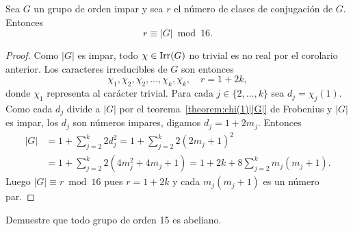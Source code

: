 \begin{theorem}[Burnside]
  Sea $G$ un grupo de orden impar y sea $r$ el número de clases de conjugación
  de $G$. Entonces 
  \[
	  r\equiv|G|\bmod{16}.
  \]
\end{theorem}

\begin{proof}
  Como $|G|$ es impar, todo $\chi\in\operatorname{Irr}(G)$ no trivial es no real por el
  corolario anterior. Los caracteres irreducibles de $G$ son entonces 
  \[
    \chi_1,\chi_2,\overline{\chi_2},\dots,\chi_k,\overline{\chi_k},
    \quad
    r=1+2k,
  \]
  donde $\chi_1$ representa al carácter trivial. 
  Para cada $j\in\{2,\dots,k\}$ sea $d_j=\chi_j(1)$.   Como cada $d_j$ divide a
  $|G|$ por el teorema~\ref{theorem:chi(1)||G|} de Frobenius y $|G|$ es impar, los $d_j$ son
  números impares, digamos $d_j=1+2m_j$. Entonces 
  \begin{align*}
    |G|&=1+\sum_{j=2}^k 2d_j^2=1+\sum_{j=2}^k2(2m_j+1)^2\\
    &=1+\sum_{j=2}^k2(4m_j^2+4m_j+1)
    =1+2k+8\sum_{j=2}^km_j(m_j+1).
  \end{align*}
  Luego $|G|\equiv r\bmod{16}$ pues $r=1+2k$ y cada $m_j(m_j+1)$ es un número par. 
\end{proof}

\begin{exercise}
Demuestre que todo grupo de orden 15 es abeliano.
\end{exercise}



